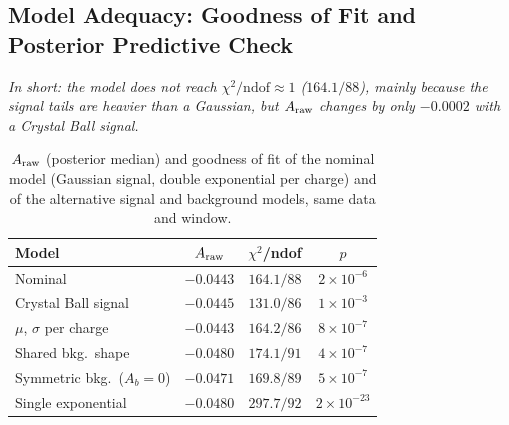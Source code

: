 \subsection{Model Adequacy: Goodness of Fit and Posterior Predictive Check}
\label{sec:bayes_gof}
\emph{In short: the model does not reach $\chi^2/\mathrm{ndof}\approx1$ ($164.1/88$), mainly because the signal tails are heavier than a Gaussian, but $A_{\mathrm{raw}}$ changes by only $-0.0002$ with a Crystal Ball signal.}
\begin{table}[!t]
\centering
\begin{tabular}{lccc}
\toprule
Model & $A_{\mathrm{raw}}$ & $\chi^2$/ndof & $p$ \\
\midrule
Nominal & $-0.0443$ & $164.1/88$ & $2\times10^{-6}$ \\
Crystal Ball signal & $-0.0445$ & $131.0/86$ & $1\times10^{-3}$ \\
$\mu$, $\sigma$ per charge & $-0.0443$ & $164.2/86$ & $8\times10^{-7}$ \\
Shared bkg.\ shape & $-0.0480$ & $174.1/91$ & $4\times10^{-7}$ \\
Symmetric bkg.\ ($A_b=0$) & $-0.0471$ & $169.8/89$ & $5\times10^{-7}$ \\
Single exponential & $-0.0480$ & $297.7/92$ & $2\times10^{-23}$ \\
\bottomrule
\end{tabular}
\caption{$A_{\mathrm{raw}}$ (posterior median) and goodness of fit of the nominal model (Gaussian signal, double exponential per charge) and of the alternative signal and background models, same data and window.}
\label{tab:gof}
\end{table}


